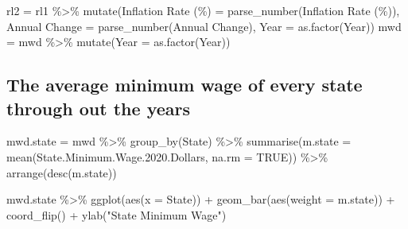 \documentclass[
]{article}
\newenvironment{Shaded}{\begin{snugshade}}{\end{snugshade}}
\newcommand{\AttributeTok}[1]{\textcolor[rgb]{0.77,0.63,0.00}{#1}}
\newcommand{\ConstantTok}[1]{\textcolor[rgb]{0.00,0.00,0.00}{#1}}
\newcommand{\FloatTok}[1]{\textcolor[rgb]{0.00,0.00,0.81}{#1}}
\newcommand{\FunctionTok}[1]{\textcolor[rgb]{0.00,0.00,0.00}{#1}}
\newcommand{\NormalTok}[1]{#1}
\newcommand{\OtherTok}[1]{\textcolor[rgb]{0.56,0.35,0.01}{#1}}
\newcommand{\SpecialCharTok}[1]{\textcolor[rgb]{0.00,0.00,0.00}{#1}}
\newcommand{\StringTok}[1]{\textcolor[rgb]{0.31,0.60,0.02}{#1}}
\begin{document}
\begin{Shaded}
\begin{Highlighting}[]
\NormalTok{rl2 }\OtherTok{=}\NormalTok{ rl1 }\SpecialCharTok{\%\textgreater{}\%} \FunctionTok{mutate}\NormalTok{(}\StringTok{\textasciigrave{}}\AttributeTok{Inflation Rate (\%)}\StringTok{\textasciigrave{}} \OtherTok{=} \FunctionTok{parse\_number}\NormalTok{(}\StringTok{\textasciigrave{}}\AttributeTok{Inflation Rate (\%)}\StringTok{\textasciigrave{}}\NormalTok{), }
               \StringTok{\textasciigrave{}}\AttributeTok{Annual Change}\StringTok{\textasciigrave{}} \OtherTok{=} \FunctionTok{parse\_number}\NormalTok{(}\StringTok{\textasciigrave{}}\AttributeTok{Annual Change}\StringTok{\textasciigrave{}}\NormalTok{), }
               \AttributeTok{Year =} \FunctionTok{as.factor}\NormalTok{(Year))}
\NormalTok{mwd }\OtherTok{=}\NormalTok{ mwd }\SpecialCharTok{\%\textgreater{}\%} \FunctionTok{mutate}\NormalTok{(}\AttributeTok{Year =} \FunctionTok{as.factor}\NormalTok{(Year))}
\end{Highlighting}
\end{Shaded}

\hypertarget{the-average-minimum-wage-of-every-state-through-out-the-years}{%
\subsection{The average minimum wage of every state through out the
years}\label{the-average-minimum-wage-of-every-state-through-out-the-years}}

\begin{Shaded}
\begin{Highlighting}[]
\NormalTok{mwd.state }\OtherTok{=}\NormalTok{ mwd }\SpecialCharTok{\%\textgreater{}\%} \FunctionTok{group\_by}\NormalTok{(State) }\SpecialCharTok{\%\textgreater{}\%} 
  \FunctionTok{summarise}\NormalTok{(}\AttributeTok{m.state =} \FunctionTok{mean}\NormalTok{(State.Minimum.Wage.}\FloatTok{2020.}\NormalTok{Dollars, }\AttributeTok{na.rm =} \ConstantTok{TRUE}\NormalTok{)) }\SpecialCharTok{\%\textgreater{}\%}
  \FunctionTok{arrange}\NormalTok{(}\FunctionTok{desc}\NormalTok{(m.state))}

\NormalTok{mwd.state }\SpecialCharTok{\%\textgreater{}\%} \FunctionTok{ggplot}\NormalTok{(}\FunctionTok{aes}\NormalTok{(}\AttributeTok{x =}\NormalTok{ State)) }\SpecialCharTok{+} 
  \FunctionTok{geom\_bar}\NormalTok{(}\FunctionTok{aes}\NormalTok{(}\AttributeTok{weight =}\NormalTok{ m.state)) }\SpecialCharTok{+} 
  \FunctionTok{coord\_flip}\NormalTok{() }\SpecialCharTok{+} 
  \FunctionTok{ylab}\NormalTok{(}\StringTok{"State Minimum Wage"}\NormalTok{)}
\end{Highlighting}
\end{Shaded}
\end{document}
